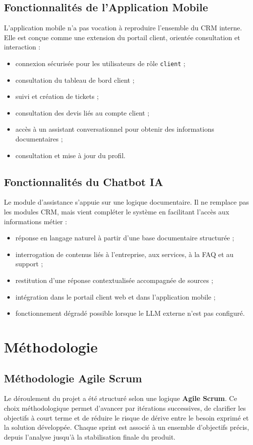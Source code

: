 \subsection{Fonctionnalités de l'Application Mobile}
L'application mobile n'a pas vocation à reproduire l'ensemble du CRM interne. Elle est conçue comme une extension du portail client, orientée consultation et interaction :
\begin{itemize}
    \item connexion sécurisée pour les utilisateurs de rôle \texttt{client} ;
    \item consultation du tableau de bord client ;
    \item suivi et création de tickets ;
    \item consultation des devis liés au compte client ;
    \item accès à un assistant conversationnel pour obtenir des informations documentaires ;
    \item consultation et mise à jour du profil.
\end{itemize}

\subsection{Fonctionnalités du Chatbot IA}
Le module d'assistance s'appuie sur une logique documentaire. Il ne remplace pas les modules CRM, mais vient compléter le système en facilitant l'accès aux informations métier :
\begin{itemize}
    \item réponse en langage naturel à partir d'une base documentaire structurée ;
    \item interrogation de contenus liés à l'entreprise, aux services, à la FAQ et au support ;
    \item restitution d'une réponse contextualisée accompagnée de sources ;
    \item intégration dans le portail client web et dans l'application mobile ;
    \item fonctionnement dégradé possible lorsque le LLM externe n'est pas configuré.
\end{itemize}

\section{Méthodologie}

\subsection{Méthodologie Agile Scrum}
Le déroulement du projet a été structuré selon une logique \textbf{Agile Scrum}. Ce choix méthodologique permet d'avancer par itérations successives, de clarifier les objectifs à court terme et de réduire le risque de dérive entre le besoin exprimé et la solution développée. Chaque sprint est associé à un ensemble d'objectifs précis, depuis l'analyse jusqu'à la stabilisation finale du produit.

